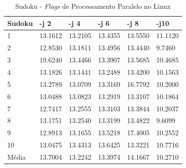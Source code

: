 \begin{apendicesenv}
\begin{table}[!ht]
\centering
\tiny
\caption{Sudoku - \textit{Flags} de Processamento Paralelo no Linux}
\label{tab:flag_processamento_paralelo:linux:sudoku}
\begin{tabular}{llllll}
\textbf{Sudoku} & \textbf{-j 2} & \textbf{-j 4} & \textbf{-j 6} & \textbf{-j 8} & \textbf{-j10}  \\ \toprule
1               & 13.1612 & 13.2105 & 13.4355 & 13.5550 & 11.1120  \\ 
2               & 12.8530 & 13.1811 & 13.4956 & 13.4440 & 9.7460   \\ 
3               & 19.6240 & 13.4466 & 13.3907 & 13.5685 & 10.4685  \\ 
4               & 13.1826 & 13.1441 & 13.2488 & 13.4200 & 10.1563  \\ 
5               & 13.2789 & 13.0709 & 13.3169 & 16.7792 & 10.2000  \\ 
6               & 13.0488 & 13.0823 & 13.2919 & 13.3107 & 10.1864  \\ 
7               & 12.7417 & 13.2555 & 13.3103 & 13.3844 & 10.2037  \\ 
8               & 13.1751 & 13.2540 & 13.3199 & 13.4822 & 9.6099   \\ 
9               & 12.8913 & 13.1655 & 13.5218 & 17.4005 & 10.2552  \\ 
10              & 13.0475 & 13.4313 & 13.6425 & 13.3221 & 10.7716  \\ \bottomrule
Média           & 13.7004 & 13.2242 & 13.3974 & 14.1667 & 10.2710  \\ 
\end{tabular}
\end{table}


\end{apendicesenv}
